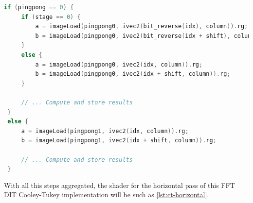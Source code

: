 \documentclass[
  oneside,
  11pt, a4paper,
  footinclude=true,
  headinclude=true,
  cleardoublepage=empty
]{scrbook}
\begin{document}
\begin{lstlisting}[language=C]
 if (pingpong == 0) {
     if (stage == 0) {
         a = imageLoad(pingpong0, ivec2(bit_reverse(idx), column)).rg;
         b = imageLoad(pingpong0, ivec2(bit_reverse(idx + shift), column)).rg;
     }
     else {
         a = imageLoad(pingpong0, ivec2(idx, column)).rg;
         b = imageLoad(pingpong0, ivec2(idx + shift, column)).rg;
     }

     // ... Compute and store results
 }
 else {
     a = imageLoad(pingpong1, ivec2(idx, column)).rg;
     b = imageLoad(pingpong1, ivec2(idx + shift, column)).rg;

     // ... Compute and store results
 }
\end{lstlisting}







With all this steps aggregated, the shader for the horizontal pass of this FFT DIT Cooley-Tukey implementation will be such as \autoref{lst:ct-horizontal}.
\end{document}
